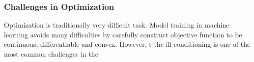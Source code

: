\subsubsection{Challenges in Optimization}

Optimization is traditionally very difficult task. Model training in machine learning avoids many difficulties by carefully construct objective function to be continuous, differentiable and convex. However, t
the ill conditioning is one of the most common challenges in the 
